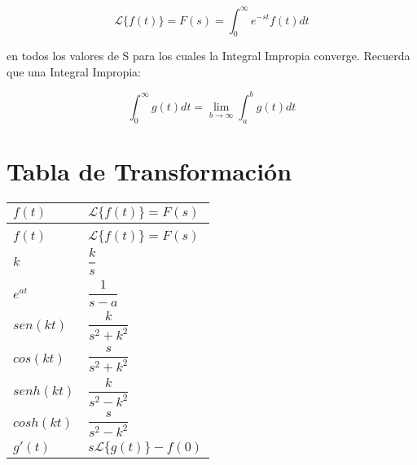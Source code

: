 \documentclass[12pt]{report}                                %
\begin{document}
        \begin{equation}   
            \mathscr{L}\{f(t)\} = F(s) = \int_0^\infty e^{-st} f(t) dt 
        \end{equation}    


        en todos los valores de S para los cuales la Integral Impropia converge.
        Recuerda que una Integral Impropia:

        \begin{equation*}   
            \int_0^\infty g(t) dt = \lim_{b \to \infty} \int_a^b g(t) dt
        \end{equation*}  


    \clearpage
    \section{Tabla de Transformación}

        \begin{longtable}{p{60mm} || p{70mm}}
            \renewcommand{\arraystretch}{1.5}
            \Huge $f(t)$ & \Huge $\mathscr{L}\{f(t)\} = F(s)$                                   \\ [1.5ex] 
            \hline\hline                                                                        \\
            \endfirsthead   
            \Huge $f(t)$ & \Huge $\mathscr{L}\{f(t)\} = F(s)$                                   \\ [1.5ex]
            \hline\hline                                                                   
            \endhead

            \Large $k$                               &\Large      $\dfrac{k}{s}$                \\ [3.0ex]
            \Large $e^{at}$                          &\Large      $\dfrac{1}{s-a}$              \\ [3.0ex]
            \Large $sen(kt)$                         &\Large      $\dfrac{k}{s^2+k^2}$          \\ [3.0ex]
            \Large $cos(kt)$                         &\Large      $\dfrac{s}{s^2+k^2}$          \\ [3.0ex]
            \Large $senh(kt)$                        &\Large      $\dfrac{k}{s^2-k^2}$          \\ [3.0ex]
            \Large $cosh(kt)$                        &\Large      $\dfrac{s}{s^2-k^2}$          \\ [3.0ex]
            \Large $g'(t)$                           &\Large      $s\mathscr{L}\{g(t)\} -f(0)$  \\ [3.0ex]

 
        \end{longtable}
\end{document}
